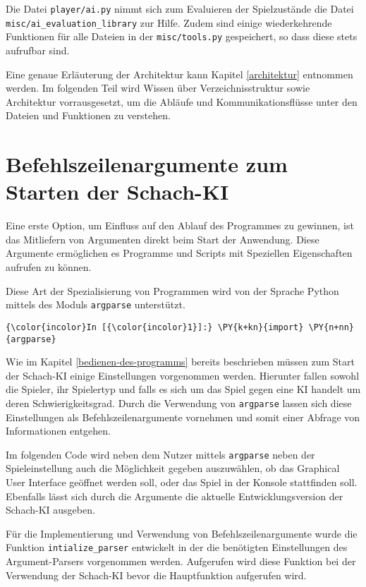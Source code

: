 Die Datei \texttt{player/ai.py} nimmt sich zum Evaluieren der
Spielzustände die Datei \texttt{misc/ai\_evaluation\_library} zur Hilfe.
Zudem sind einige wiederkehrende Funktionen für alle Dateien in der
\texttt{misc/tools.py} gespeichert, so dass diese stets aufrufbar sind.

Eine genaue Erläuterung der Architektur kann Kapitel \ref{architektur} entnommen
werden. Im folgenden Teil wird Wissen über Verzeichnisstruktur sowie
Architektur vorrausgesetzt, um die Abläufe und Kommunikationsflüsse
unter den Dateien und Funktionen zu verstehen.

    \section{Befehlszeilenargumente zum Starten der
Schach-KI}\label{befehlszeilenargumente-zum-starten-der-schach-ki}

Eine erste Option, um Einfluss auf den Ablauf des Programmes zu
gewinnen, ist das Mitliefern von Argumenten direkt beim Start der
Anwendung. Diese Argumente ermöglichen es Programme und Scripts mit
Speziellen Eigenschaften aufrufen zu können.

Diese Art der Spezialisierung von Programmen wird von der Sprache Python
mittels des Moduls \texttt{argparse} unterstützt.

    \begin{Verbatim}[commandchars=\\\{\}]
{\color{incolor}In [{\color{incolor}1}]:} \PY{k+kn}{import} \PY{n+nn}{argparse}
\end{Verbatim}

    Wie im Kapitel \ref{bedienen-des-programms} bereits beschrieben müssen zum Start der Schach-KI
einige Einstellungen vorgenommen werden. Hierunter fallen sowohl die
Spieler, ihr Spielertyp und falls es sich um das Spiel gegen eine KI
handelt um deren Schwierigkeitsgrad. Durch die Verwendung von
\texttt{argparse} lassen sich diese Einstellungen als
Befehlszeilenargumente vornehmen und somit einer Abfrage von
Informationen entgehen.

Im folgenden Code wird neben dem Nutzer mittels \texttt{argparse} neben
der Spieleinstellung auch die Möglichkeit gegeben auszuwählen, ob das
Graphical User Interface geöffnet werden soll, oder das Spiel in der
Konsole stattfinden soll. Ebenfalls lässt sich durch die Argumente die
aktuelle Entwicklungsversion der Schach-KI ausgeben.

Für die Implementierung und Verwendung von Befehlszeilenargumente wurde
die Funktion \texttt{intialize\_parser} entwickelt in der die benötigten
Einstellungen des Argument-Parsers vorgenommen werden. Aufgerufen wird
diese Funktion bei der Verwendung der Schach-KI bevor die Hauptfunktion
aufgerufen wird.

